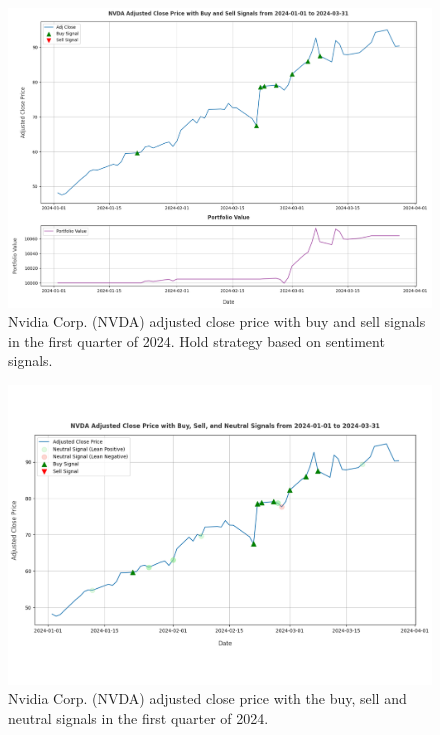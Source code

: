 \begin{figure}[htbp]
    \centering
    \includegraphics[width=\textwidth]{img/experiment-stock/nvda-hold-strategy-a.pdf}
    \caption{Nvidia Corp. (NVDA) adjusted close price with buy and sell signals in the first quarter of 2024. Hold strategy based on sentiment signals.}
    \label{fig:elsa-experiment-stock-nvda-hold-strategy}
\end{figure}

\begin{figure}[hbp]
    \centering
    \includegraphics[width=\textwidth]{img/experiment-stock/nvda-neutral-a.pdf}
    \caption{Nvidia Corp. (NVDA) adjusted close price with the buy, sell and neutral signals in the first quarter of 2024.}
    \label{fig:elsa-experiment-stock-nvda-neutral}
\end{figure}

